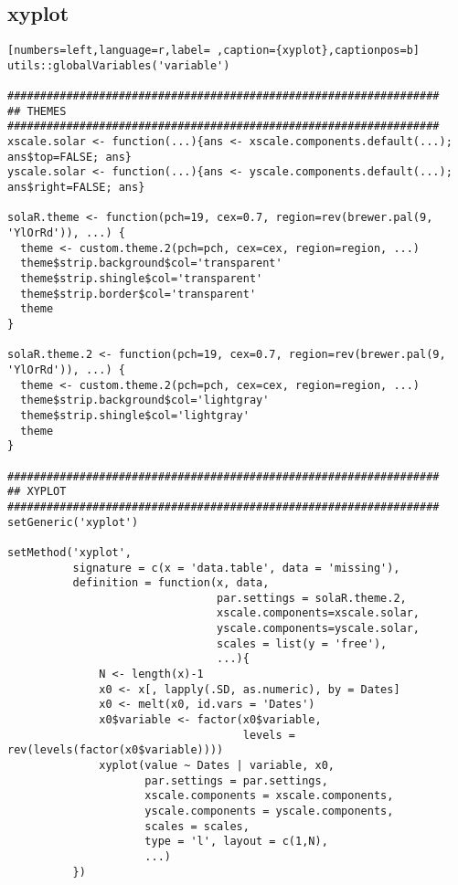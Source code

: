 \subsection{xyplot}
\label{sec:orge62f832}
\label{subsec:xyplot}
\begin{lstlisting}[numbers=left,language=r,label= ,caption={xyplot},captionpos=b]
utils::globalVariables('variable')

##################################################################
## THEMES
##################################################################
xscale.solar <- function(...){ans <- xscale.components.default(...); ans$top=FALSE; ans}
yscale.solar <- function(...){ans <- yscale.components.default(...); ans$right=FALSE; ans}

solaR.theme <- function(pch=19, cex=0.7, region=rev(brewer.pal(9, 'YlOrRd')), ...) {
  theme <- custom.theme.2(pch=pch, cex=cex, region=region, ...)
  theme$strip.background$col='transparent'
  theme$strip.shingle$col='transparent'
  theme$strip.border$col='transparent'
  theme
}

solaR.theme.2 <- function(pch=19, cex=0.7, region=rev(brewer.pal(9, 'YlOrRd')), ...) {
  theme <- custom.theme.2(pch=pch, cex=cex, region=region, ...)
  theme$strip.background$col='lightgray'
  theme$strip.shingle$col='lightgray'
  theme
}

##################################################################
## XYPLOT
##################################################################
setGeneric('xyplot')

setMethod('xyplot',
          signature = c(x = 'data.table', data = 'missing'),
          definition = function(x, data,
                                par.settings = solaR.theme.2,
                                xscale.components=xscale.solar,
                                yscale.components=yscale.solar,
                                scales = list(y = 'free'),
                                ...){
              N <- length(x)-1
              x0 <- x[, lapply(.SD, as.numeric), by = Dates]
              x0 <- melt(x0, id.vars = 'Dates')
              x0$variable <- factor(x0$variable,
                                    levels = rev(levels(factor(x0$variable))))
              xyplot(value ~ Dates | variable, x0,
                     par.settings = par.settings,
                     xscale.components = xscale.components,
                     yscale.components = yscale.components,
                     scales = scales,
                     type = 'l', layout = c(1,N),
                     ...)
          })


\end{lstlisting}
